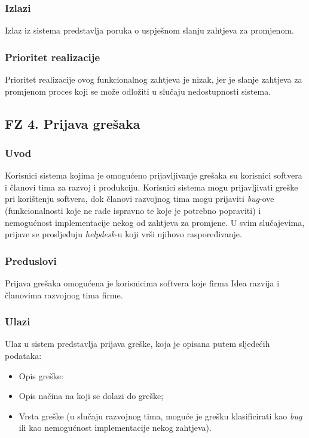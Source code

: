 \documentclass[12pt,a4paper]{article}
\begin{document}
\subsubsection{Izlazi}

Izlaz iz sistema predstavlja poruka o uspješnom slanju zahtjeva za promjenom.

\subsubsection{Prioritet realizacije}

Prioritet realizacije ovog funkcionalnog zahtjeva je nizak, jer je slanje zahtjeva za promjenom proces koji se može odložiti u slučaju nedostupnosti sistema.

\newpage

\subsection{FZ 4. Prijava grešaka}

\subsubsection{Uvod}

Korisnici sistema kojima je omogućeno prijavljivanje grešaka su korisnici softvera i članovi tima za razvoj i produkciju. Korisnici sistema mogu prijavljivati greške pri korištenju softvera, dok članovi razvojnog tima mogu prijaviti \textit{bug}-ove (funkcionalnosti koje ne rade ispravno te koje je potrebno popraviti) i nemogućnost implementacije nekog od zahtjeva za promjene. U svim slučajevima, prijave se prosljeđuju \textit{helpdesk}-u koji vrši njihovo raspoređivanje.

\subsubsection{Preduslovi}

Prijava grešaka omogućena je korisnicima softvera koje firma Idea razvija i članovima razvojnog tima firme.

\subsubsection{Ulazi}

Ulaz u sistem predstavlja prijava greške, koja je opisana putem sljedećih podataka:

\begin{itemize}
\item Opis greške:
\item Opis načina na koji se dolazi do greške;
\item Vrsta greške (u slučaju razvojnog tima, moguće je grešku klasificirati kao \textit{bug} ili kao nemogućnost implementacije nekog zahtjeva).
\end{itemize}
\end{document}
